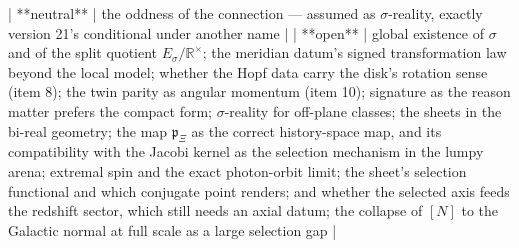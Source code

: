 | **neutral** | the oddness of the connection — assumed as $\sigma$-reality, exactly version 21's conditional under another name |
| **open** | global existence of $\sigma$ and of the split quotient $E_\sigma/\mathbb R^\times$; the meridian datum's signed transformation law beyond the local model; whether the Hopf data carry the disk's rotation sense (item 8); the twin parity as angular momentum (item 10); signature as the reason matter prefers the compact form; $\sigma$-reality for off-plane classes; the sheets in the bi-real geometry; the map $\mathfrak p_\Xi$ as the correct history-space map, and its compatibility with the Jacobi kernel as the selection mechanism in the lumpy arena; extremal spin and the exact photon-orbit limit; the sheet's selection functional and which conjugate point renders; and whether the selected axis feeds the redshift sector, which still needs an axial datum; the collapse of $[N]$ to the Galactic normal at full scale as a large selection gap |

